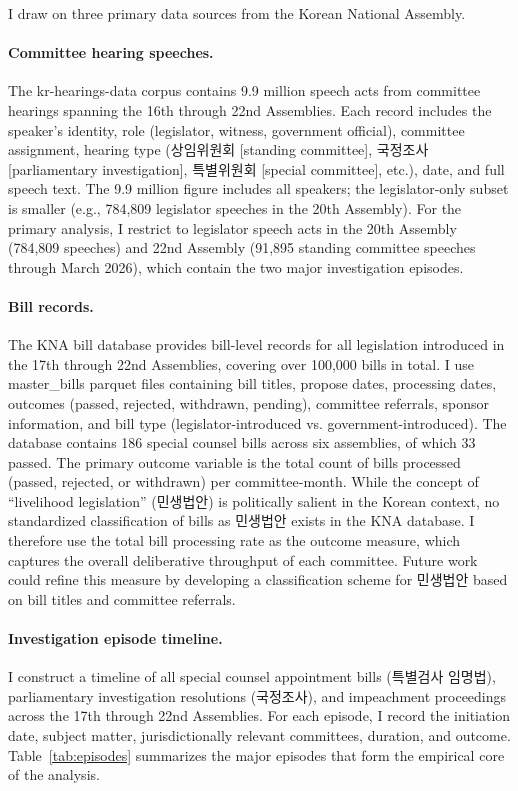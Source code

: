 \documentclass[11pt]{article}
\begin{document}
I draw on three primary data sources from the Korean National Assembly.

\paragraph{Committee hearing speeches.} The kr-hearings-data corpus contains 9.9 million speech acts from committee hearings spanning the 16th through 22nd Assemblies. Each record includes the speaker's identity, role (legislator, witness, government official), committee assignment, hearing type (상임위원회 [standing committee], 국정조사 [parliamentary investigation], 특별위원회 [special committee], etc.), date, and full speech text. The 9.9 million figure includes all speakers; the legislator-only subset is smaller (e.g., 784,809 legislator speeches in the 20th Assembly). For the primary analysis, I restrict to legislator speech acts in the 20th Assembly (784,809 speeches) and 22nd Assembly (91,895 standing committee speeches through March 2026), which contain the two major investigation episodes.

\paragraph{Bill records.} The KNA bill database provides bill-level records for all legislation introduced in the 17th through 22nd Assemblies, covering over 100,000 bills in total. I use master\_bills parquet files containing bill titles, propose dates, processing dates, outcomes (passed, rejected, withdrawn, pending), committee referrals, sponsor information, and bill type (legislator-introduced vs. government-introduced). The database contains 186 special counsel bills across six assemblies, of which 33 passed. The primary outcome variable is the total count of bills processed (passed, rejected, or withdrawn) per committee-month. While the concept of ``livelihood legislation'' (민생법안) is politically salient in the Korean context, no standardized classification of bills as 민생법안 exists in the KNA database. I therefore use the total bill processing rate as the outcome measure, which captures the overall deliberative throughput of each committee. Future work could refine this measure by developing a classification scheme for 민생법안 based on bill titles and committee referrals.

\paragraph{Investigation episode timeline.} I construct a timeline of all special counsel appointment bills (특별검사 임명법), parliamentary investigation resolutions (국정조사), and impeachment proceedings across the 17th through 22nd Assemblies. For each episode, I record the initiation date, subject matter, jurisdictionally relevant committees, duration, and outcome. Table~\ref{tab:episodes} summarizes the major episodes that form the empirical core of the analysis.
\end{document}

